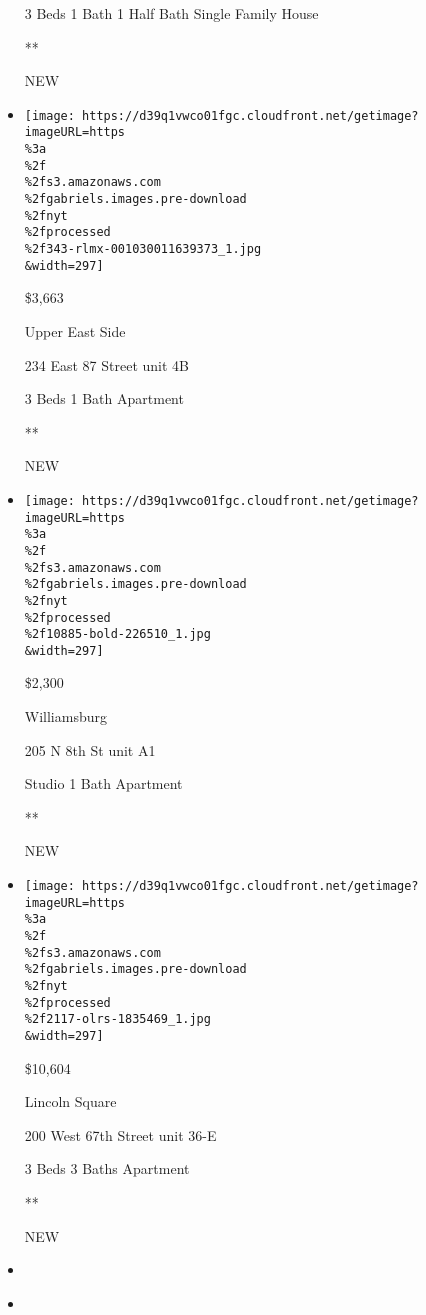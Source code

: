 \begin{itemize}
  3 Beds \textbar{} 1 Bath \textbar{} 1 Half Bath \textbar{} Single
  Family House

  **

  NEW
\item
  \href{/real-estate/usa/ny/new-york/upper-east-side/homes-for-rent/234-east-87-street/343-RLMX-001030011639373?}{}

  \texttt{[image: https://d39q1vwco01fgc.cloudfront.net/getimage?imageURL=https\\\%3a\\\%2f\\\%2fs3.amazonaws.com\\\%2fgabriels.images.pre-download\\\%2fnyt\\\%2fprocessed\\\%2f343-rlmx-001030011639373\_1.jpg\\\&width=297]}

  \$3,663

  Upper East Side

  234 East 87 Street unit 4B

  3 Beds \textbar{} 1 Bath \textbar{} Apartment

  **

  NEW
\item
  \href{/real-estate/usa/ny/brooklyn/williamsburg/homes-for-rent/205-n-8th-st/10885-BOLD-226510?}{}

  \texttt{[image: https://d39q1vwco01fgc.cloudfront.net/getimage?imageURL=https\\\%3a\\\%2f\\\%2fs3.amazonaws.com\\\%2fgabriels.images.pre-download\\\%2fnyt\\\%2fprocessed\\\%2f10885-bold-226510\_1.jpg\\\&width=297]}

  \$2,300

  Williamsburg

  205 N 8th St unit A1

  Studio \textbar{} 1 Bath \textbar{} Apartment

  **

  NEW
\item
  \href{/real-estate/usa/ny/new-york/lincoln-square/homes-for-rent/200-west-67th-street/2117-OLRS-1835469?}{}

  \texttt{[image: https://d39q1vwco01fgc.cloudfront.net/getimage?imageURL=https\\\%3a\\\%2f\\\%2fs3.amazonaws.com\\\%2fgabriels.images.pre-download\\\%2fnyt\\\%2fprocessed\\\%2f2117-olrs-1835469\_1.jpg\\\&width=297]}

  \$10,604

  Lincoln Square

  200 West 67th Street unit 36-E

  3 Beds \textbar{} 3 Baths \textbar{} Apartment

  **

  NEW
\item
\item
  \href{/real-estate/usa/ny/new-york/upper-east-side/homes-for-rent/the-easton-205-east-92nd-st/46-4381517?}{}


\end{itemize}
